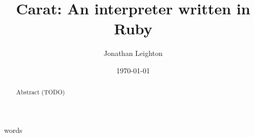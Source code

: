 \documentclass[10pt,a4paper]{article}
\title{Carat: An interpreter written in Ruby}
\author{Jonathan Leighton}
\date{\today}
\numberwithin{figure}{section}
\begin{document}
	\maketitle
	
	 words
	
	\begin{abstract}
	Abstract (TODO)
	\end{abstract}
	
	\tableofcontents
	
	\setlength{\parindent}{0pt}
  \setlength{\parskip}{2ex}
	
	
	
	
	
	\printglossary
\end{document}
